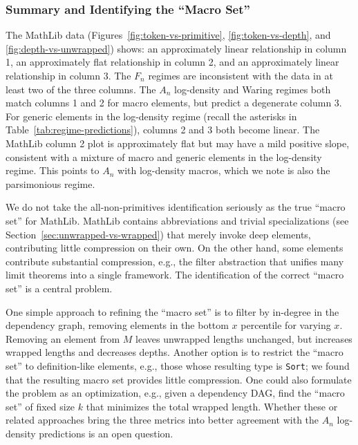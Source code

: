 \documentclass[12pt]{amsart}
\theoremstyle{definition}
\theoremstyle{remark}
\newcommand{\leaninline}[1]{\lstinline[style=lean]!#1!}
\begin{document}
\subsubsection{Summary and Identifying the ``Macro Set''}\label{mathlib_summary}

The MathLib data (Figures~\ref{fig:token-vs-primitive}, 
\ref{fig:token-vs-depth}, and \ref{fig:depth-vs-unwrapped}) shows: an approximately linear relationship in column 1, an approximately flat relationship in column 2, and an approximately linear relationship in column 3. 
The $F_n$ regimes are inconsistent with the data in at least two of the three columns.
The $A_n$ log-density and Waring regimes both match columns 1 and 2 for macro elements, but predict a degenerate column 3.
For generic elements in the log-density regime (recall the asterisks in Table~\ref{tab:regime-predictions}), columns 2 and 3 both become linear.
The MathLib column 2 plot is approximately flat but may have a mild positive slope, consistent with a mixture of macro and generic elements in the log-density regime.
This points to $A_n$ with log-density macros, which we note is also the parsimonious regime.

We do not take the all-non-primitives identification seriously as the true ``macro set'' for MathLib.
MathLib contains abbreviations and trivial specializations (see Section~\ref{sec:unwrapped-vs-wrapped}) that merely invoke deep elements, contributing little compression on their own.
On the other hand, some elements contribute substantial compression, e.g., the filter abstraction that unifies many limit theorems into a single framework.
The identification of the correct ``macro set'' is a central problem.

One simple approach to refining the ``macro set'' is to filter by in-degree in the dependency graph, removing elements in the bottom $x$ percentile for varying $x$. 
Removing an element from $M$ leaves unwrapped lengths unchanged, but increases wrapped lengths and decreases depths. 
Another option is to restrict the ``macro set'' to definition-like elements, e.g., those whose resulting type is \leaninline{Sort}; we found that the resulting macro set provides little compression.
One could also formulate the problem as an optimization, e.g., given a dependency DAG, find the ``macro set'' of fixed size $k$ that minimizes the total wrapped length.
Whether these or related approaches bring the three metrics into better agreement with the $A_n$ log-density predictions is an open question.
\end{document}
